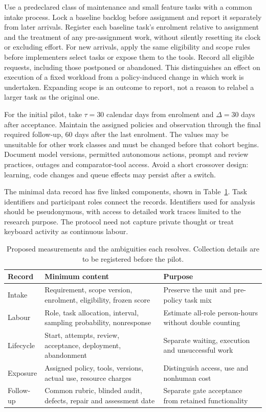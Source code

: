 \documentclass[11pt,a4paper]{amsart}
\theoremstyle{definition}
\theoremstyle{remark}
\begin{document}
Use a predeclared class of maintenance and small feature tasks with a common intake process. Lock a baseline backlog before assignment and report it separately from later arrivals. Register each baseline task's enrolment relative to assignment and the treatment of any pre-assignment work, without silently resetting its clock or excluding effort. For new arrivals, apply the same eligibility and scope rules before implementers select tasks or expose them to the tools. Record all eligible requests, including those postponed or abandoned. This distinguishes an effect on execution of a fixed workload from a policy-induced change in which work is undertaken. Expanding scope is an outcome to report, not a reason to relabel a larger task as the original one.

For the initial pilot, take $\tau=30$ calendar days from enrolment and $\Delta=30$ days after acceptance. Maintain the assigned policies and observation through the final required follow-up, 60 days after the last enrolment. The values may be unsuitable for other work classes and must be changed before that cohort begins. Document model versions, permitted autonomous actions, prompt and review practices, outages and comparator-tool access. Avoid a short crossover design: learning, code changes and queue effects may persist after a switch.

The minimal data record has five linked components, shown in Table~\ref{tab:study}. Task identifiers and participant roles connect the records. Identifiers used for analysis should be pseudonymous, with access to detailed work traces limited to the research purpose. The protocol need not capture private thought or treat keyboard activity as continuous labour.

\begin{table}[tb]
\caption{Proposed measurements and the ambiguities each resolves. Collection details are to be registered before the pilot.}
\label{tab:study}
\small
\begin{tabularx}{\linewidth}{@{}p{.21\linewidth}X X@{}}
\toprule
Record & Minimum content & Purpose\\
\midrule
Intake & Requirement, scope version, enrolment, eligibility, frozen score & Preserve the unit and pre-policy task mix\\
Labour & Role, task allocation, interval, sampling probability, nonresponse & Estimate all-role person-hours without double counting\\
Lifecycle & Start, attempts, review, acceptance, deployment, abandonment & Separate waiting, execution and unsuccessful work\\
Exposure & Assigned policy, tools, versions, actual use, resource charges & Distinguish access, use and nonhuman cost\\
Follow-up & Common rubric, blinded audit, defects, repair and assessment date & Separate gate acceptance from retained functionality\\
\bottomrule
\end{tabularx}
\end{table}
\end{document}
